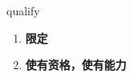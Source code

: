 
\begin{frame}
{\huge qualify}
\begin{center}
\begin{enumerate}\Large
  \item \textbf{限定}
  \item \textbf{使有资格，使有能力}
\end{enumerate}
\end{center}
\end{frame}
